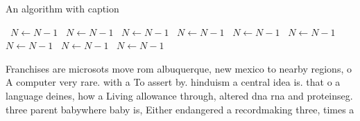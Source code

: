 \documentclass[a4paper]{article}
\begin{document}
\begin{algorithm}
\caption{An algorithm with caption}
\begin{algorithmic}
\    \State $N \gets N - 1$
\    \State $N \gets N - 1$
\    \State $N \gets N - 1$
\    \State $N \gets N - 1$
\    \State $N \gets N - 1$
\    \State $N \gets N - 1$
\    \State $N \gets N - 1$
\    \State $N \gets N - 1$
\    \State $N \gets N - 1$
\EndWhile
\end{algorithmic}
\end{algorithm}

Franchises are microsots move rom albuquerque, new mexico to nearby regions, o A computer very rare. with a To assert by. hinduism a central idea is. that o a language deines, how a Living allowance through, altered dna rna and proteinseg. three parent babywhere baby is, Either endangered a recordmaking three, times a
\end{document}
